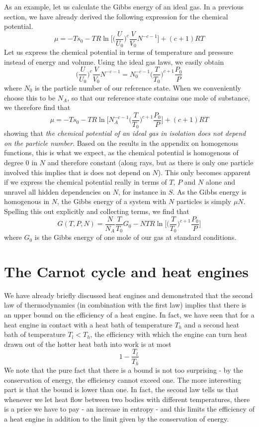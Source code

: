 \documentclass[a4paper, draft]{article}
\theoremstyle{own}
\theoremstyle{remark}
\begin{document}
As an example, let us calculate the Gibbs energy of an ideal gas. In a previous section, we have already derived the following expression for the chemical potential.
$$
\mu  = -T s_0 - T R \ln \big[ \big( \frac{U}{U_0} \big)^c \frac{V}{V_0} N^{-c - 1}  \big] + (c+1) RT 
$$
Let us express the chemical potential in terms of temperature and pressure instead of energy and volume. Using the ideal gas laws, we easily obtain
$$
\big( \frac{U}{U_0} \big)^c \frac{V}{V_0} N^{-c - 1} = N_0^{-c - 1} \big( \frac{T}{T_0} \big)^{c+1} \frac{P_0}{P}
$$
where $N_0$ is the particle number of our reference state. When we conveniently choose this to be $N_A$, so that our reference state contains one mole of substance, we therefore find that
$$
\mu  = -T s_0 - T R \ln \big[ N_A^{-c - 1} \big( \frac{T}{T_0} \big)^{c+1} \frac{P_0}{P}  \big] + (c+1) RT
$$
showing that {\em the chemical potential of an ideal gas in isolation does not depend on the particle number}. Based on the results in the appendix on homogenous functions, this is what we expect, as the chemical potential is homogenous of degree $0$ in $N$ and therefore constant (along rays, but as there is only one particle involved this implies that is does not depend on $N$). This only becomes apparent if we express the chemical potential really in terms of $T$, $P$ and $N$ alone and unravel all hidden dependencies on $N$, for instance in $S$.  As the Gibbs energy is homogenous in $N$,  the Gibbs energy of a system with $N$ particles is simply $\mu N$. Spelling this out explicitly and collecting terms, we find that
$$
G(T, P, N) = \frac{N}{N_A} \frac{T}{T_0} G_0 - N T R  \ln \big[ \big( \frac{T}{T_0} \big)^{c+1} \frac{P_0}{P}  \big]
$$
where $G_0$ is the Gibbs energy of one mole of our gas at standard conditions.

\section{The Carnot cycle and heat engines}

We have already briefly discussed heat engines and demonstrated that the second law of thermodynamics (in combination with the first law) implies that there is an upper bound on the efficiency of a heat engine. In fact, we have seen that for a heat engine in contact with a heat bath of temperature $T_h$ and a second heat bath of temperature $T_l < T_h$, the efficiency with which the engine can turn heat drawn out of the hotter heat bath into work is at most
$$
1 - \frac{T_l}{T_h}
$$
We note that the pure fact that there is a bound is not too surprising - by the conservation of energy, the efficiency cannot exceed one. The more interesting part is that the bound is lower than one. In fact, the second law tells us that whenever we let heat flow between two bodies with different temperatures, there is a price we have to pay - an increase in entropy - and this limits the efficiency of a heat engine in addition to the limit given by the conservation of energy.
\end{document}
